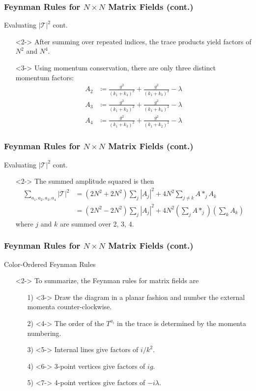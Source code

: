 \documentclass{beamer}
\begin{document}
\begin{frame}
    \frametitle{Feynman Rules for $N\times N$ Matrix Fields (cont.)}
    \alert{Evaluating $|\mathcal{T}|^2$ cont.}
    \begin{itemize}
        \item[\textbullet]<2-> After summing over repeated indices, the trace products yield factors of $N^2$ and $N^4$.
        \item[\textbullet]<3-> Using momentum conservation, there are only three distinct momentum factors: 
        \begin{align*}
            A_2 &\coloneqq \frac{g^2}{(k_1 + k_4)^2} + \frac{g^2}{(k_1+k_3)^2} - \lambda \\
            A_3 &\coloneqq \frac{g^2}{(k_1 + k_2)^2} + \frac{g^2}{(k_1+k_4)^2} - \lambda \\
            A_4 &\coloneqq \frac{g^2}{(k_1 + k_3)^2} + \frac{g^2}{(k_1+k_2)^2} - \lambda 
        \end{align*}
    \end{itemize}
\end{frame}

\begin{frame}
    \frametitle{Feynman Rules for $N\times N$ Matrix Fields (cont.)}
    \alert{Evaluating $|\mathcal{T}|^2$ cont.}
    \begin{itemize}
        \item[\textbullet]<2-> The summed amplitude squared is then
        \begin{align*}
            \sum_{a_1,a_2,a_3,a_4}|\mathcal{T}|^2 &= (2N^2 + 2N^2)\sum_j |A_j|^2 + 4N^2\sum_{j\neq k} A*_jA_k \\
            &= (2N^2 - 2N^2)\sum_j |A_j|^2 + 4N^2\left(\sum_{j} A*_j\right)\left(\sum_k A_k \right)
        \end{align*}
        where $j$ and $k$ are summed over 2, 3, 4.
    \end{itemize}
\end{frame}

\begin{frame}
    \frametitle{Feynman Rules for $N\times N$ Matrix Fields (cont.)}
    \alert{Color-Ordered Feynman Rules}
    \begin{itemize}
        \item[\textbullet]<2-> To summarize, the Feynman rules for matrix fields are
        \begin{itemize}
            \item[1)]<3-> Draw the diagram in a planar fashion and number the external momenta counter-clockwise.
            \item[2)]<4-> The order of the $T^{a_i}$ in the trace is determined by the momenta numbering.
            \item[3)]<5-> Internal lines give factors of $i/k^2$.
            \item[4)]<6-> 3-point vertices give factors of $ig$. 
            \item[5)]<7-> 4-point vertices give factors of $-i\lambda$. 
        \end{itemize}
    \end{itemize}
\end{frame}
\end{document}
